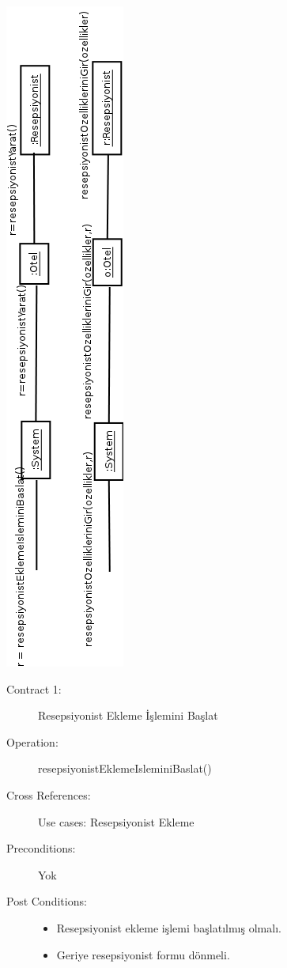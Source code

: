\documentclass[12pt,a4paper]{report}
\begin{document}
\newpage

\begin{center}
\includegraphics{dia/eventdiagram-usecase5.png}
\end{center}

\newpage

\begin{description}
\item[Contract 1:] Resepsiyonist Ekleme İşlemini Başlat
\item[Operation:] resepsiyonistEklemeIsleminiBaslat()
\item[Cross References:] Use cases: Resepsiyonist Ekleme
\item[Preconditions:] Yok
\item[Post Conditions:] \hspace{10 mm}
\begin{itemize} 
\item Resepsiyonist ekleme işlemi başlatılmış olmalı.
\item Geriye resepsiyonist formu dönmeli. \\
\end{itemize}
\end{description}
\end{document}
